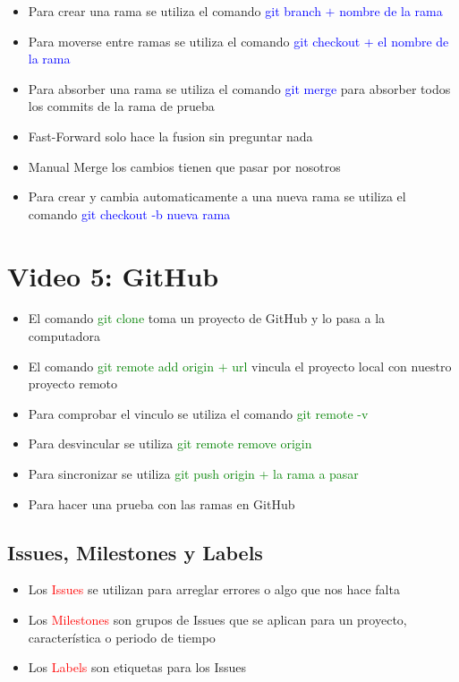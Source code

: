\documentclass{article}
\begin{document}
	\begin{itemize}
	\item Para crear una rama se utiliza el comando \textcolor{blue}{git branch $+$ nombre de la rama}
	\item Para moverse entre ramas se utiliza el comando \textcolor{blue}{git checkout + el nombre de la rama}
	\item Para absorber una rama se utiliza el comando \textcolor{blue}{git merge} para absorber todos los commits de la rama de prueba
	\item Fast-Forward solo hace la fusion sin preguntar nada
	\item Manual Merge los cambios tienen que pasar por nosotros
	\item Para crear y cambia automaticamente a una nueva rama se utiliza el comando \textcolor{blue}{git checkout -b nueva rama}
	\end{itemize}

	\section{Video 5: GitHub}
	
	\begin{itemize}
		
	\item El comando \textcolor{green}{git clone} toma un proyecto de GitHub y lo pasa a la computadora
	\item El comando \textcolor{green}{git remote add origin $+$ url} vincula el proyecto local con nuestro proyecto remoto
	\item Para comprobar el vinculo se utiliza el comando \textcolor{green}{git remote -v}
	\item Para desvincular se utiliza \textcolor{green}{git remote remove origin}
	\item Para sincronizar se utiliza \textcolor{green}{git push origin + la rama a pasar}
	\item Para hacer una prueba con las ramas en GitHub
	\end{itemize}
	
	\subsection{Issues, Milestones y Labels}
	
	\begin{itemize}
		\item Los \textcolor{red}{Issues} se utilizan para arreglar errores o algo que nos hace falta
		\item Los \textcolor{red}{Milestones} son grupos de Issues que se aplican para un proyecto, característica o periodo de tiempo
		\item Los \textcolor{red}{Labels} son etiquetas para los Issues
	\end{itemize}
\end{document}
